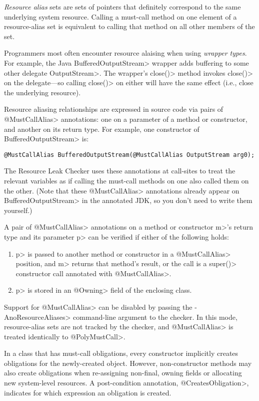 \emph{Resource alias} sets are sets of pointers that
definitely correspond to the same underlying system resource.
Calling a must-call method on one element of a resource-alias set
is equivalent to calling that method on all other members of the set.

Programmers most often encounter resource alaising when using \emph{wrapper types}.
For example, the Java \<BufferedOutputStream> wrapper adds buffering to some other delegate \<OutputStream>.
The wrapper's \<close()> method invokes \<close()> on the delegate---so calling \<close()> on either
will have the same effect (i.e., close the underlying resource).

Resource aliasing relationships are expressed in source code via pairs of \<@MustCallAlias> annotations:
one on a parameter of a method or constructor, and another on its return type.
For example, one constructor of \<BufferedOutputStream> is:
\begin{verbatim}
@MustCallAlias BufferedOutputStream(@MustCallAlias OutputStream arg0);
\end{verbatim}
The Resource Leak Checker uses these annotations at call-sites to treat the relevant variables as if
calling the must-call methods on one also called them on the other.
(Note that these \<@MustCallAlias> annotations already appear on
\<BufferedOutputStream> in the annotated JDK, so you don't need to write
them yourself.)

A pair of \<@MustCallAlias> annotations on a method or constructor \<m>'s return type
and its parameter \<p> can be verified if either of the following holds:
\begin{enumerate}
\item \<p> is passed to another method or constructor in a
  \<@MustCallAlias> position, and \<m> returns that method's result,
  or the call is a \<super()> constructor call annotated
  with \<@MustCallAlias>.
\item \<p> is stored in an \<@Owning> field of the enclosing class.
\end{enumerate}

Support for \<@MustCallAlias> can be disabled by passing the \<-AnoResourceAliases> command-line
argument to the checker. In this mode, resource-alias sets are not tracked by the checker,
and \<@MustCallAlias> is treated identically to \<@PolyMustCall>.



In a class that has must-call obligations,
every constructor implicitly creates obligations for the newly-created object.
However, non-constructor methods may also create obligations
when re-assigning non-final, owning fields or allocating
new system-level resources.
A post-condition annotation,
\<@CreatesObligation>,
indicates for which expression an obligation is created.

